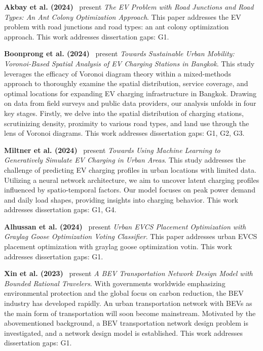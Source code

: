 \documentclass[letterpaper, 12pt, oneside, doublespacing]{Thesis}
\begin{document}
\noindent \textbf{Akbay et al. (2024)}~\cite{the_electric_2024} present \textit{The EV Problem with Road Junctions and Road Types: An Ant Colony Optimization Approach}. This paper addresses the EV problem with road junctions and road types: an ant colony optimization approach. This work addresses dissertation gaps: G1.



\noindent \textbf{Boonprong et al. (2024)}~\cite{towards_sustainable_2024} present \textit{Towards Sustainable Urban Mobility: Voronoi-Based Spatial Analysis of EV Charging Stations in Bangkok}. This study leverages the efficacy of Voronoi diagram theory within a mixed-methods approach to thoroughly examine the spatial distribution, service coverage, and optimal locations for expanding EV charging infrastructure in Bangkok. Drawing on data from field surveys and public data providers, our analysis unfolds in four key stages. Firstly, we delve into the spatial distribution of charging stations, scrutinizing density, proximity to various road types, and land use through the lens of Voronoi diagrams. This work addresses dissertation gaps: G1, G2, G3.



\noindent \textbf{Miltner et al. (2024)}~\cite{towards_using_2024} present \textit{Towards Using Machine Learning to Generatively Simulate EV Charging in Urban Areas}. This study addresses the challenge of predicting EV charging profiles in urban locations with limited data. Utilizing a neural network architecture, we aim to uncover latent charging profiles influenced by spatio-temporal factors. Our model focuses on peak power demand and daily load shapes, providing insights into charging behavior. This work addresses dissertation gaps: G1, G4.



\noindent \textbf{Alhussan et al. (2024)}~\cite{urban_electric_2024} present \textit{Urban EVCS Placement Optimization with Graylag Goose Optimization Voting Classifier}. This paper addresses urban EVCS placement optimization with graylag goose optimization votin. This work addresses dissertation gaps: G1.



\noindent \textbf{Xin et al. (2023)}~\cite{a_battery_2023} present \textit{A BEV Transportation Network Design Model with Bounded Rational Travelers}. With governments worldwide emphasizing environmental protection and the global focus on carbon reduction, the BEV industry has developed rapidly. An urban transportation network with BEVs as the main form of transportation will soon become mainstream. Motivated by the abovementioned background, a BEV transportation network design problem is investigated, and a network design model is established. This work addresses dissertation gaps: G1.
\end{document}
